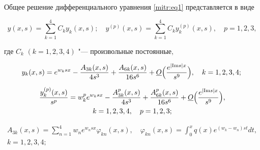 \begin{lemma}[2]Общее решение дифференциального уравнения \eqref{mitr:eq1} представляется в виде

\begin{equation}

\label{mitr:eq7}

y(x,s)=\sum^4_{k=1} C_k y_k(x,s); \quad

y^{(p)}(x,s)=\sum^4_{k=1} C_k y^{(p)}_k(x,s), \quad  p=1, 2, 3,

\end{equation}

где $C_k$ $(k=1, 2, 3, 4)$ "--- произвольные постоянные$,$

\begin{equation}

\label{mitr:eq8}

y_k(x,s)=e^{w_ksx}-\frac{A_{3k}(x,s)}{4s^3}+ \frac{A_{6k}(x,s)}{16s^6}+

\underline O\Bigl(\frac{e^{|\mathrm{Im} s|x}}{s^9}\Bigr), \quad k=1, 2, 3, 4;\\

\end{equation}

\begin{equation}

\label{mitr:eq10}

\begin{gathered}

\frac{y^{(p)}_k(x,s)}{s^p}=w^p_k e^{w_ksx}-\frac{A^p_{3k}(x,s)}{4s^3}+

\frac{A^p_{6k}(x,s)}{16s^6}+

\underline O\Bigl(\frac{e^{|\mathrm{Im} s|x}}{s^9}\Bigr), \\ k=1, 2, 3, 4, \quad p=1, 2, 3;

\end{gathered}

\end{equation}

\begin{equation}

\label{mitr:eq10}

\begin{gathered}

A_{3k}(x,s)=\sum^4_{n=1} w_n e^{w_nsx}\varphi_{kn}(x,s), \quad \varphi_{kn} (x,s)=

\int ^x_0 q(x) e^{(w_k-w_n)st} dt, \\ k=1,2,3,4;

\end{gathered}


\end{equation}
\end{lemma}
